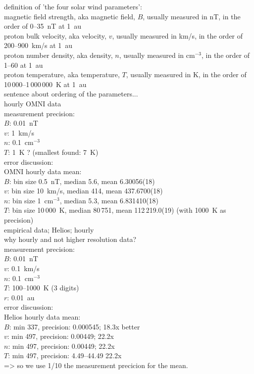 definition of 'the four solar wind parameters':\\	%
	magnetic field strength, aka magnetic field, $B$, usually measured in nT, in the order of 0--35~nT at 1~au\\
	proton bulk velocity, aka velocity, $v$, usually measured in km/s, in the order of 200--900~km/s at 1~au\\
	proton number density, aka density, $n$, usually measured in cm$^{-3}$, in the order of 1--60 at 1~au\\
	proton temperature, aka temperature, $T$, usually measured in K, in the order of 10\,000--1\,000\,000~K at 1~au\\
sentence about ordering of the parameters...\\


hourly OMNI data\\
measurement precision:\\
$B$: 0.01~nT\\
$v$: 1~km/s\\
$n$: 0.1~cm$^{-3}$\\
$T$: 1~K ? (smallest found: 7~K)\\

error discussion:\\
OMNI hourly data mean:\\
$B$: bin size 0.5~nT, median 5.6, mean 6.30056(18)\\
$v$: bin size 10~km/s, median 414, mean 437.6700(18)\\
$n$: bin size 1~cm$^{-3}$, median 5.3, mean 6.831410(18)\\
$T$: bin size 10\,000~K, median 80\,751, mean 112\,219.0(19) (with 1000~K as precision)\\

empirical data; Helios; hourly\\
why hourly and not higher resolution data?\\
measurement precision:\\
$B$: 0.01~nT\\
$v$: 0.1~km/s\\
$n$: 0.1~cm$^{-3}$\\
$T$: 100--1000~K (3 digits)\\
$r$: 0.01~au\\

error discussion:\\
Helios hourly data mean:\\
$B$: min 337, precision: 0.000545; 18.3x better\\
$v$: min 497, precision: 0.00449; 22.2x\\
$n$: min 497, precision:  0.00449; 22.2x\\
$T$: min 497, precision: 4.49--44.49 22.2x\\
=> so we use 1/10 the measurement precicion for the mean.\\

